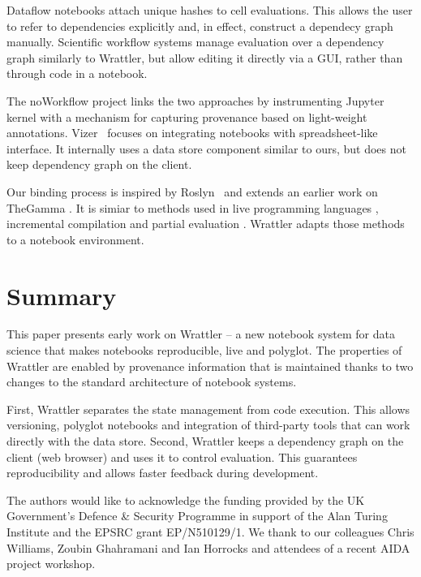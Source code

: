 \documentclass[sigplan]{acmart}\settopmatter{printfolios=true,printccs=false,printacmref=false}
\begin{document}
Dataflow notebooks \cite{dataflow} attach unique hashes to cell 
evaluations. This allows the user to refer to dependencies explicitly and, in effect, construct
a dependecy graph manually.
Scientific workflow systems \cite{taverna,kepler} manage evaluation over a 
dependency graph similarly to Wrattler, but allow editing it directly via a GUI, rather
than through code in a notebook.

The noWorkflow project \cite{noworkflow} links the two approaches by instrumenting Jupyter 
kernel with a mechanism for capturing provenance based on light-weight annotations.
Vizer~\cite{vizer} focuses on integrating notebooks with spreadsheet-like interface.
It internally uses a data store component similar to ours, but does not keep dependency graph
on the client.

Our binding process is inspired by Roslyn~\cite{roslyn} and extends an
earlier work on TheGamma \cite{livegamma}. It is simiar to methods used in live programming 
languages \cite{live,subtext}, incremental compilation \cite{incremental} and
partial evaluation \cite{partial}. Wrattler adapts those methods to a notebook environment. 

\section{Summary}

This paper presents early work on Wrattler -- a new notebook system for data science that makes
notebooks reproducible, live and polyglot. The properties of Wrattler are enabled by provenance
information that is maintained thanks to two changes to the standard architecture of notebook 
systems. 

First, Wrattler separates the state management from code execution. This allows versioning,
polyglot notebooks and integration of third-party tools that can work directly with
the data store. Second, Wrattler keeps a dependency graph on the client (web browser) and uses 
it to control evaluation. This guarantees reproducibility and allows faster feedback during
development.

\begin{acks}
The authors would like to acknowledge the funding provided by the UK Government's Defence \& 
Security Programme in support of the Alan Turing Institute and the EPSRC grant EP/N510129/1.
We thank to our colleagues Chris Williams, Zoubin Ghahramani and Ian Horrocks and attendees 
of a recent AIDA project workshop.
\end{acks}


\end{document}
